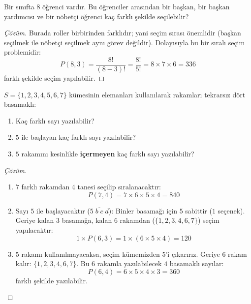 \begin{example}
Bir sınıfta $8$ öğrenci vardır. Bu öğrenciler arasından bir başkan, bir başkan yardımcısı ve bir nöbetçi öğrenci kaç farklı şekilde seçilebilir?
\end{example}
\begin{proof}[Çözüm]
Burada roller birbirinden farklıdır; yani seçim sırası önemlidir (başkan seçilmek ile nöbetçi seçilmek aynı görev değildir). Dolayısıyla bu bir sıralı seçim problemidir:
\[ P(8, 3) = \frac{8!}{(8-3)!} = \frac{8!}{5!} = 8 \times 7 \times 6 = 336 \]
farklı şekilde seçim yapılabilir.
\end{proof}

\begin{example}
$S = \{1, 2, 3, 4, 5, 6, 7\}$ kümesinin elemanları kullanılarak rakamları tekrarsız dört basamaklı:
\begin{enumerate}
  \item Kaç farklı sayı yazılabilir?
  \item $5$ ile başlayan kaç farklı sayı yazılabilir?
  \item $5$ rakamını kesinlikle \textbf{içermeyen} kaç farklı sayı yazılabilir?
\end{enumerate}
\end{example}
\begin{proof}[Çözüm]
\begin{enumerate}
  \item $7$ farklı rakamdan $4$ tanesi seçilip sıralanacaktır:
  \[ P(7, 4) = 7 \times 6 \times 5 \times 4 = 840 \]
  
  \item Sayı $5$ ile başlayacaktır ($\overline{5\;b\;c\;d}$):
  Binler basamağı için $5$ sabittir ($1$ seçenek). Geriye kalan $3$ basamağa, kalan $6$ rakamdan ($\{1, 2, 3, 4, 6, 7\}$) seçim yapılacaktır:
  \[ 1 \times P(6, 3) = 1 \times (6 \times 5 \times 4) = 120 \]

  \item $5$ rakamı kullanılmayacaksa, seçim kümemizden $5$'i çıkarırız. Geriye $6$ rakam kalır: $\{1, 2, 3, 4, 6, 7\}$. Bu $6$ rakamla yazılabilecek $4$ basamaklı sayılar:
  \[ P(6, 4) = 6 \times 5 \times 4 \times 3 = 360 \]
  farklı şekilde yazılabilir.
\end{enumerate}
\end{proof}


